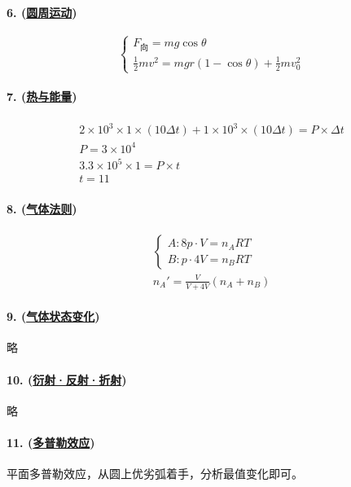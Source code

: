 \paragraph{6. (\hyperref[subsec:圆周运动]{圆周运动})}

\begin{equation*}
    \begin{cases}
        F_\textrm{向}=mg\cos\theta\\
        \frac12mv^2=mgr(1-\cos\theta)+\frac12mv_0^2
    \end{cases}
\end{equation*}

\paragraph{7. (\hyperref[sec:热与能量]{热与能量})}

\begin{gather*}
    2\times10^3\times1\times(10\Delta t)+1\times10^3\times(10\Delta t)=P\times\Delta t\\
    P=3\times10^4\\
    3.3\times10^5\times1=P\times t\\
    t=11
\end{gather*}

\paragraph{8. (\hyperref[subsec:气体法则]{气体法则})}

\begin{gather*}
    \begin{cases}
        A: 8p\cdot V=n_ART\\
        B: p\cdot 4V=n_BRT
    \end{cases}\\
    n_A'=\frac{V}{V+4V}(n_A+n_B)
\end{gather*}

\paragraph{9. (\hyperref[subsec:气体状态变化]{气体状态变化})} 略
\paragraph{10. (\hyperref[subsec:衍射·反射·折射]{衍射·反射·折射})} 略
\paragraph{11. (\hyperref[subsec:多普勒效应]{多普勒效应})} 平面多普勒效应，从圆上优劣弧着手，分析最值变化即可。
